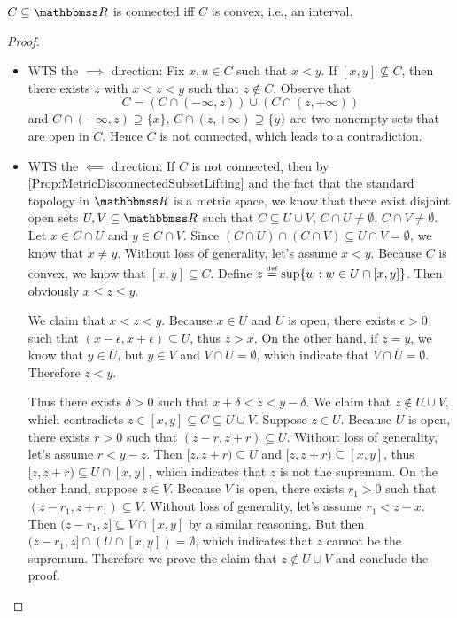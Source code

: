 \documentclass[screen,single]{techreport}
\numberwithin{equation}{section}
\begin{document}
\begin{theorem}\label{The:RConnectedConvex}
	$C \subseteq \bbR$ is connected iff $C$ is convex, i.e., an interval.
\end{theorem}
\begin{proof}\
  \begin{itemize}
    \item WTS the $\implies$ direction: Fix $x,u \in C$ such that $x<y$.
    If $[x,y] \not\subseteq C$, then there exists $z$ with $x < z < y$ such that $z \not\in C$.
    Observe that
    \[
    C = (C \cap (-\infty,z)) \cup (C \cap (z,+\infty))
    \]
    and $C \cap (-\infty,z) \supseteq \{ x\}$, $C \cap (z,+\infty) \supseteq \{ y\}$ are two nonempty sets that are open in $C$.
    Hence $C$ is not connected, which leads to a contradiction.
    
    \item WTS the $\impliedby$ direction: If $C$ is not connected, then by \cref{Prop:MetricDisconnectedSubsetLifting} and the fact that the standard topology in $\bbR$ is a metric space, we know that there exist disjoint open sets $U,V \subseteq \bbR$ such that $C \subseteq U \cup V$, $C \cap U \neq \emptyset$, $C \cap V \neq \emptyset$.
    Let $x \in C \cap U$ and $y \in C \cap V$.
    Since $(C \cap U) \cap (C \cap V) \subseteq U \cap V = \emptyset$, we know that $x \neq y$.
    Without loss of generality, let's assume $x<y$.
    Because $C$ is convex, we know that $[x,y] \subseteq C$.
    Define $z \mathrel{\overset{\underset{\textnormal{def}}{}}{=}} \sup \{ w : w \in U \cap [x,y] \}$.
    Then obviously $x \le z \le y$.
    
    We claim that $x < z < y$. Because $x \in U$ and $U$ is open, there exists $\epsilon>0$ such that $(x-\epsilon,x+\epsilon) \subseteq U$, thus $z > x$.
    On the other hand, if $z=y$, we know that $y \in \overline{U}$, but $y \in V$ and $V \cap U = \emptyset$, which indicate that $V \cap \overline{U} = \emptyset$.
    Therefore $z < y$.
    
    Thus there exists $\delta>0$ such that $x +\delta < z < y -\delta$.
    We claim that $z \not\in U \cup V$, which contradicts $z \in [x,y] \subseteq C \subseteq U \cup V$.
    Suppose $z \in U$. Because $U$ is open, there exists $r > 0$ such that $(z-r,z+r) \subseteq U$.
    Without loss of generality, let's assume $r < y-z$.
    Then $[z,z+r) \subseteq U$ and $[z,z+r) \subseteq [x,y]$, thus $[z,z+r) \subseteq U \cap [x,y]$, which indicates that $z$ is not the supremum.
    On the other hand, suppose $z \in V$.
    Because $V$ is open, there exists $r_1 > 0$ such that $(z-r_1,z+r_1) \subseteq V$.
    Without loss of generality, let's assume $r_1 < z-x$.
    Then $(z-r_1,z] \subseteq V \cap [x,y]$ by a similar reasoning.
    But then $(z-r_1,z] \cap (U \cap [x,y]) = \emptyset$, which indicates that $z$ cannot be the supremum.
    Therefore we prove the claim that $z \not\in U \cup V$ and conclude the proof.
  \end{itemize}
\end{proof}
\end{document}
